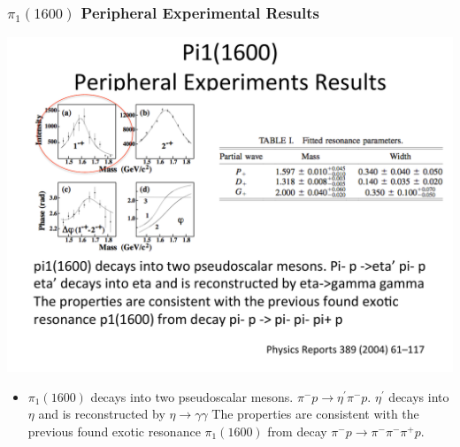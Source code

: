 \documentclass[mathserif,18pt,xcolor=table]{beamer}
\begin{document}
\begin{frame}
  \frametitle{$\pi_1(1600)$ Peripheral Experimental Results}
  \begin{center}
    \includegraphics[width=.95\linewidth]{../figures/ping1600.pdf}
  \end{center}
  \small{
    \begin{itemize}
    \item $\pi_1(1600)$ decays into two pseudoscalar mesons. $\pi^- p\rightarrow \eta^{\prime} \pi^- p$. $\eta^{\prime}$ decays into $\eta$ and is reconstructed by $\eta\rightarrow\gamma\gamma$ The properties are consistent with the previous found exotic resonance $\pi_1(1600)$ from decay $\pi^- p \rightarrow \pi^- \pi^- \pi^+ p$.
  \end{itemize}}
\end{frame}
\end{document}
